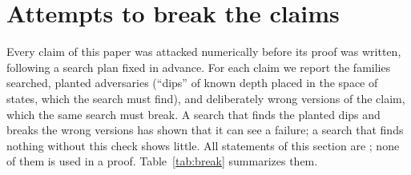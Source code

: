 \section{Attempts to break the claims}
\label{sec:break}

Every claim of this paper was attacked numerically before its proof was written, following a search plan fixed in advance.
For each claim we report the families searched, planted adversaries (``dips'' of known depth placed in the space of states, which the search must find), and deliberately wrong versions of the claim, which the same search must break.
A search that finds the planted dips and breaks the wrong versions has shown that it can see a failure; a search that finds nothing without this check shows little.
All statements of this section are \numst; none of them is used in a proof.
Table~\ref{tab:break} summarizes them.

